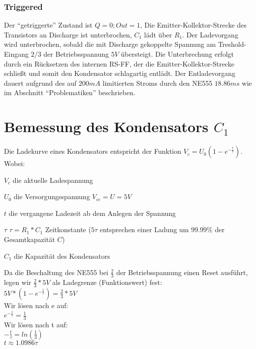 \documentclass[12pt,titlepage]{article}
\begin{document}
		\subsubsection{Triggered}
			Der ``getriggerte'' Zustand ist $Q=0; Out=1$, Die Emitter-Kollektor-Strecke des Transistors an Discharge ist unterbrochen, $C_1$ lädt über $R_1$.
			Der Ladevorgang wird unterbrochen, sobald die mit Discharge gekoppelte Spannung am Treshold-Eingang $2/3$ der Betriebsspannung $5V$ übersteigt.
			Die Unterbrechung erfolgt durch ein Rücksetzen des internen RS-FF, der die Emitter-Kollektor-Strecke schließt und somit den Kondensator schlagartig entlädt.
			Der Entladevorgang dauert aufgrund des auf $200mA$ limitierten Stroms durch den NE555 $18.86ms$ wie im Abschnitt ``Problematiken'' beschrieben. 
			
\newpage
	\section{Bemessung des Kondensators $C_1$}
		Die Ladekurve eines Kondensators entspricht der Funktion $V_c = U_0(1-e^{-\frac{t}{\tau}})$.
		Wobei:
		\begin{description*}
			\item[$V_c$] die aktuelle Ladespannung
			\item[$U_0$] die Versorgungsspannung $V_{cc}=U=5V$
			\item[$t$] die vergangene Ladezeit ab dem Anlegen der Spannung
			\item[$\tau$] $\tau=R_1*C_1$ Zeitkonstante ($5\tau$ entsprechen einer Ladung um $99.\overline{99}\%$ der Gesamtkapazität $C$)
			\item[$C_1$] die Kapazität des Kondensators
		\end{description*}
		Da die Beschaltung  des NE555 bei $\frac{2}{3}$ der Betriebsspannung einen Reset ausführt, legen wir $\frac{2}{3}*5V$ als Ladegrenze (Funktionswert) fest: \\
		$5V*(1-e^{-\frac{t}{\tau}}) = \frac{2}{3}*5V$ \\
		Wir lösen nach e auf: \\
		$e^{-\frac{t}{\tau}} = \frac{1}{3}$ \\
		Wir lösen nach t auf: \\
		$-\frac{t}{\tau} = ln(\frac{1}{3})$ \\
		$t \approx 1.0986\tau$ \\
		
\end{document}
